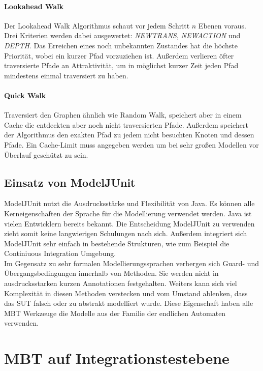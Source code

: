 \paragraph{Lookahead Walk}
Der Lookahead Walk Algorithmus schaut vor jedem Schritt $n$ Ebenen voraus. Drei Kriterien werden dabei ausgewertet: \textit{NEWTRANS}, \textit{NEWACTION} und \textit{DEPTH}. Das Erreichen eines noch unbekannten Zustandes hat die höchste Priorität, wobei ein kurzer Pfad vorzuziehen ist. Außerdem verlieren öfter traversierte Pfade an Attraktivität, um in möglichst kurzer Zeit jeden Pfad mindestens einmal traversiert zu haben.

\paragraph{Quick Walk}
Traversiert den Graphen ähnlich wie Random Walk, speichert aber in einem Cache die entdeckten aber noch nicht traversierten Pfade. Außerdem speichert der Algorithmus den exakten Pfad zu jedem nicht besuchten Knoten und dessen Pfade. Ein Cache-Limit muss angegeben werden um bei sehr großen Modellen vor Überlauf geschützt zu sein.

\subsection{Einsatz von ModelJUnit}
ModelJUnit nutzt die Ausdrucksstärke und Flexibilität von Java. Es können alle Kerneigenschaften der Sprache für die Modellierung verwendet werden. Java ist vielen Entwicklern bereits bekannt. Die Entscheidung ModelJUnit zu verwenden zieht somit keine langwierigen Schulungen nach sich. Außerdem integriert sich ModelJUnit sehr einfach in bestehende Strukturen, wie zum Beispiel die Continiuous Integration Umgebung.\\
Im Gegensatz zu sehr formalen Modellierungssprachen verbergen sich Guard- und Übergangsbedingungen innerhalb von Methoden. Sie werden nicht in ausdrucksstarken kurzen Annotationen festgehalten. Weiters kann sich viel Komplexität in diesen Methoden verstecken und vom Umstand ablenken, dass das \Gls{SUT} falsch oder zu abstrakt modelliert wurde. Diese Eigenschaft haben alle \Gls{MBT} Werkzeuge die Modelle aus der Familie der endlichen Automaten verwenden.

\section{MBT auf Integrationstestebene}
\label{sec:mbt_integration}

